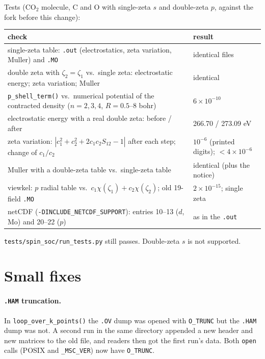 \documentclass[11pt,a4paper]{article}
\newcommand{\file}[1]{\texttt{#1}}
\newcommand{\fn}[1]{\texttt{#1()}}
\begin{document}
Tests (CO$_2$ molecule, C and O with single-zeta $s$ and double-zeta $p$, against the
fork before this change):
\begin{center}
\begin{tabular}{p{9.6cm} p{3.6cm}}
\toprule
check & result \\
\midrule
single-zeta table: \texttt{.out} (electrostatics, zeta variation, Muller) and \texttt{.MO} & identical files \\
double zeta with $\zeta_2=\zeta_1$ vs.\ single zeta: electrostatic energy; zeta variation; Muller & identical \\
\fn{p\_shell\_term} vs.\ numerical potential of the contracted density ($n=2,3,4$, $R=0.5$--$8$ bohr) & $6\times10^{-10}$ \\
electrostatic energy with a real double zeta: before / after & 266.70 / 273.09 eV \\
zeta variation: $|c_1^2+c_2^2+2c_1c_2S_{12}-1|$ after each step; change of $c_1/c_2$ & $10^{-6}$ (printed digits); $<4\times10^{-6}$ \\
Muller with a double-zeta table vs.\ single-zeta table & identical (plus the notice) \\
viewkel: $p$ radial table vs.\ $c_1\chi(\zeta_1)+c_2\chi(\zeta_2)$; old 19-field \texttt{.MO} & $2\times10^{-15}$; single zeta \\
netCDF (\texttt{-DINCLUDE\_NETCDF\_SUPPORT}): entries 10--13 ($d$, Mo) and 20--22 ($p$) & as in the \texttt{.out} \\
\bottomrule
\end{tabular}
\end{center}
\file{tests/spin\_soc/run\_tests.py} still passes. Double-zeta $s$ is not supported.

\section{Small fixes}\label{sec:fixes}

\paragraph{\texttt{.HAM} truncation.} In \fn{loop\_over\_k\_points} the \texttt{.OV} dump
was opened with \texttt{O\_TRUNC} but the \texttt{.HAM} dump was not. A second run in the
same directory appended a new header and new matrices to the old file, and readers then
got the first run's data. Both \texttt{open} calls (POSIX and \texttt{\_MSC\_VER}) now
have \texttt{O\_TRUNC}.
\end{document}
